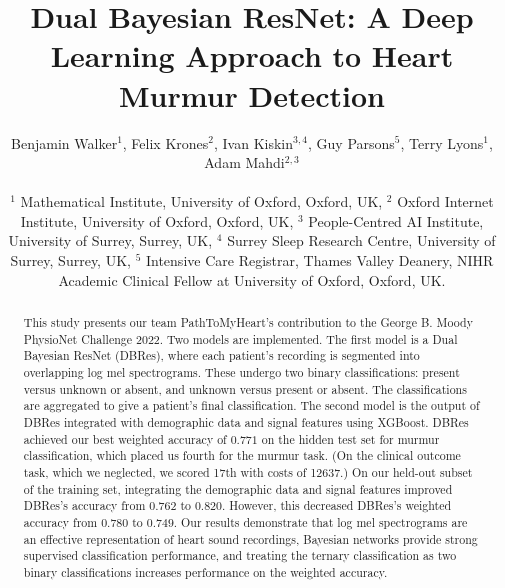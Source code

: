\documentclass[twocolumn]{cinc}
\begin{document}

\newcommand{\cmmnt}[1]{\ignorespaces}
\graphicspath{{images/}{../images/}}



\title{Dual Bayesian ResNet: A Deep Learning Approach to Heart Murmur Detection}



\author {Benjamin Walker$^{1}$, Felix Krones$^{2}$, Ivan Kiskin$^{3, 4}$, Guy Parsons$^{5}$, Terry Lyons$^{1}$,  Adam Mahdi$^{2,3}$ \\
\ \\ $^1$ Mathematical Institute, University of Oxford, Oxford, UK,
$^2$ Oxford Internet Institute, University of Oxford, Oxford, UK, 
$^3$  People-Centred AI Institute, University of Surrey, Surrey, UK, $^4$ Surrey Sleep Research Centre, University of Surrey, Surrey, UK, $^5$  Intensive Care Registrar, Thames Valley Deanery, NIHR Academic Clinical Fellow at University of Oxford, Oxford, UK.}


\maketitle

\begin{abstract}
    This study presents our team PathToMyHeart's contribution to the George B. Moody PhysioNet Challenge 2022.
Two models are implemented. The first model is a Dual Bayesian ResNet (DBRes), where each patient's recording is segmented into overlapping log mel spectrograms. These undergo two binary classifications: present versus unknown or absent, and unknown versus present or absent. The classifications are aggregated to give a patient's final classification. The second model is the output of DBRes integrated with demographic data and signal features using XGBoost.
DBRes achieved our best weighted accuracy of $0.771$ on the hidden test set for murmur classification, which placed us fourth for the murmur task. (On the clinical outcome task, which we neglected, we scored 17th with costs of 12637.) On our held-out subset of the training set, integrating the demographic data and signal features improved DBRes's accuracy from $0.762$ to $0.820$. However, this decreased DBRes's weighted accuracy from $0.780$ to $0.749$. 
Our results demonstrate that log mel spectrograms are an effective representation of heart sound recordings, Bayesian networks provide strong supervised classification performance, and treating the ternary classification as two binary classifications increases performance on the weighted accuracy.



\end{abstract}
\end{document}
